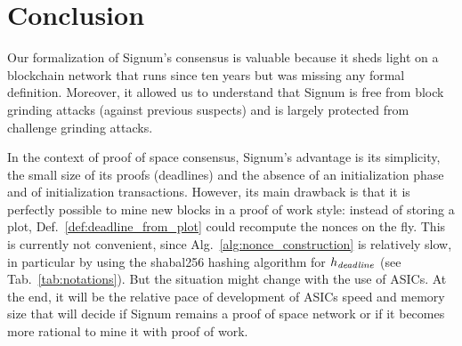 \section{Conclusion}\label{sec:conclusion}
%
Our formalization of Signum's consensus is valuable because it sheds light
on a blockchain network that runs since ten years but was missing any formal definition.
Moreover, it allowed us to understand that Signum is free from block grinding attacks
(against previous suspects) and is largely protected from challenge grinding attacks.

In the context of proof of space consensus, Signum's advantage is its simplicity,
the small size of its proofs (deadlines) and the absence of an initialization phase
and of initialization transactions. However, its main drawback is that it is
perfectly possible to mine new blocks in a proof of work style: instead of storing a plot,
Def.~\ref{def:deadline_from_plot} could recompute the nonces on the fly. This is currently
not convenient, since Alg.~\ref{alg:nonce_construction} is relatively slow, in particular
by using the shabal256 hashing algorithm for $h_{\mathit{deadline}}$ (see Tab.~\ref{tab:notations}).
But the situation might change with the use of ASICs. At the end, it will be the relative
pace of development of ASICs speed and memory size that will decide if Signum remains a
proof of space network or if it becomes more rational to mine it with proof of work.
